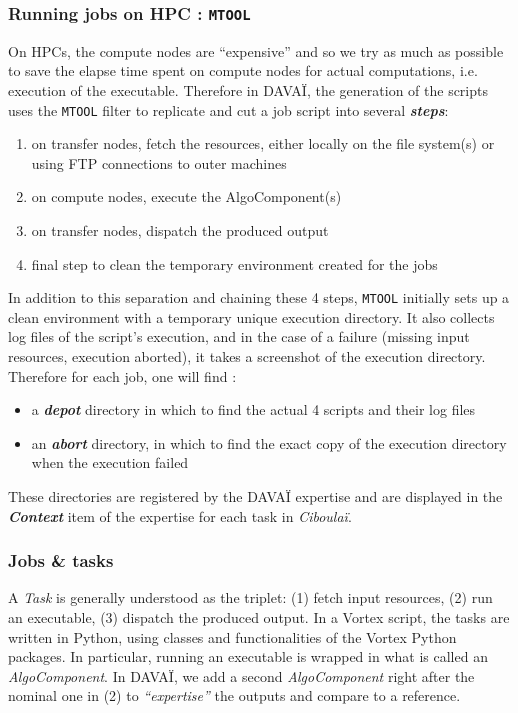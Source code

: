 \documentclass[a4paper,10pt,twoside]{article}
\begin{document}
\subsubsection{Running jobs on HPC : \texttt{MTOOL}}
On HPCs, the compute nodes are ``expensive'' and so we try as much as possible to save the elapse time spent on compute nodes for actual computations, i.e. execution of the executable.
Therefore in DAVAÏ, the generation of the scripts uses the \texttt{MTOOL} filter to replicate and cut a job script into several \textit{\textbf{steps}}:
\begin{enumerate}[label=(step.0\arabic*)]
 \item on transfer nodes, fetch the resources, either locally on the file system(s) or using FTP connections to outer machines
 \item on compute nodes, execute the AlgoComponent(s)
 \item on transfer nodes, dispatch the produced output
 \item final step to clean the temporary environment created for the jobs
\end{enumerate}

In addition to this separation and chaining these 4 steps, \texttt{MTOOL} initially sets up a clean environment with a temporary unique execution directory.
It also collects log files of the script's execution, and in the case of a failure (missing input resources, execution aborted), it takes a screenshot of the execution directory.
Therefore for each job, one will find :
\begin{itemize}
 \item a \textit{\textbf{depot}} directory in which to find the actual 4 scripts and their log files
 \item an \textit{\textbf{abort}} directory, in which to find the exact copy of the execution directory when the execution failed
\end{itemize}

\noindent These directories are registered by the DAVAÏ expertise and are displayed in the \textit{\textbf{Context}} item of the expertise for each task in \textit{Ciboulaï}.
 


\subsubsection{Jobs \& tasks}

A \textit{Task} is generally understood as the triplet: (1) fetch input resources, (2) run an executable, (3) dispatch the produced output.
In a Vortex script, the tasks are written in Python, using classes and functionalities of the Vortex Python packages. In particular, running an executable is wrapped in what is called an \textit{AlgoComponent}. In DAVAÏ, we add a second \textit{AlgoComponent} right after the nominal one in (2) to \textit{``expertise''} the outputs and compare to a reference.
\end{document}

